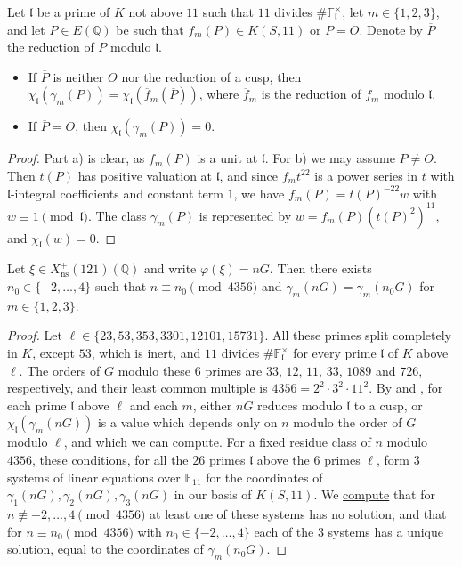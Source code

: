 \documentclass[11pt,reqno]{amsart}
\newcommand{\Q}{\mathbb{Q}}
\newcommand{\F}{\mathbb{F}}
\newcommand{\fl}{\mathfrak{l}}
\newcommand{\ns}{\mathrm{ns}}
\newcommand{\Xns}[1]{X_{\ns}^+(#1)}
\newcommand{\repocommit}{c12c8c3705ed0b6b52254df69bd5ffe84542d568}
\newcommand{\gitlink}[2]{\href{https://github.com/F-Najman/Xns-121-/blob/\repocommit/#1}{#2}}
\theoremstyle{definition}
\numberwithin{equation}{section}
\begin{document}
\begin{lemma}\label{lem:residue}
Let $\fl$ be a prime of $K$ not above $11$ such that $11$ divides $\#\F_\fl^\times$, let $m\in\{1,2,3\}$, and let $P\in E(\Q)$ be such that $f_m(P)\in K(S,11)$ or $P=O$. Denote by $\overline P$ the reduction of $P$ modulo $\fl$.
\begin{itemize}
\item[a)] If $\overline P$ is neither $O$ nor the reduction of a cusp, then $\chi_\fl(\gamma_m(P))=\chi_\fl(\overline f_m(\overline P))$, where $\overline f_m$ is the reduction of $f_m$ modulo $\fl$.
\item[b)] If $\overline P=O$, then $\chi_\fl(\gamma_m(P))=0$.
\end{itemize}
\end{lemma}

\begin{proof}
Part a) is clear, as $f_m(P)$ is a unit at $\fl$. For b) we may assume $P\neq O$. Then $t(P)$ has positive valuation at $\fl$, and since $f_m t^{22}$ is a power series in $t$ with $\fl$-integral coefficients and constant term $1$, we have $f_m(P)=t(P)^{-22}w$ with $w\equiv 1\pmod\fl$. The class $\gamma_m(P)$ is represented by $w=f_m(P)(t(P)^2)^{11}$, and $\chi_\fl(w)=0$.
\end{proof}

\begin{proposition}\label{prop:sieve}
Let $\xi\in \Xns{121}(\Q)$ and write $\varphi(\xi)=nG$. Then there exists $n_0\in\{-2,\ldots,4\}$ such that $n\equiv n_0\pmod{4356}$ and $\gamma_m(nG)=\gamma_m(n_0G)$ for $m\in\{1,2,3\}$.
\end{proposition}

\begin{proof}
Let $\ell\in\{23,53,353,3301,12101,15731\}$. All these primes split completely in $K$, except $53$, which is inert, and $11$ divides $\#\F_\fl^\times$ for every prime $\fl$ of $K$ above $\ell$. The orders of $G$ modulo these $6$ primes are $33$, $12$, $11$, $33$, $1089$ and $726$, respectively, and their least common multiple is $4356=2^2\cdot 3^2\cdot 11^2$. By  and , for each prime $\fl$ above $\ell$ and each $m$, either $nG$ reduces modulo $\fl$ to a cusp, or $\chi_\fl(\gamma_m(nG))$ is a value which depends only on $n$ modulo the order of $G$ modulo $\ell$, and which we can compute. For a fixed residue class of $n$ modulo $4356$, these conditions, for all the $26$ primes $\fl$ above the $6$ primes $\ell$, form $3$ systems of linear equations over $\F_{11}$ for the coordinates of $\gamma_1(nG),\gamma_2(nG),\gamma_3(nG)$ in our basis of $K(S,11)$. We \gitlink{code/sieve_bruteforce.m}{compute} that for $n\not\equiv -2,\ldots,4\pmod{4356}$ at least one of these systems has no solution, and that for $n\equiv n_0\pmod{4356}$ with $n_0\in\{-2,\ldots,4\}$ each of the $3$ systems has a unique solution, equal to the coordinates of $\gamma_m(n_0G)$.
\end{proof}
\end{document}
